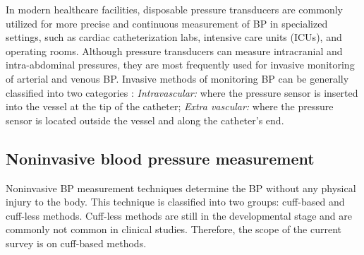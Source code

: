 \documentclass[journal,article,moreauthors]{Definitions/mdpi}
\begin{document}
In modern healthcare facilities, disposable pressure transducers are commonly utilized for more precise and continuous measurement of BP in specialized settings, such as cardiac catheterization labs, intensive care units (ICUs), and operating rooms. Although pressure transducers can measure intracranial and intra-abdominal pressures, they are most frequently used for invasive monitoring of arterial and venous BP. Invasive methods of monitoring BP can be generally classified into two categories \citep{M15}: \textit{Intravascular:} where the pressure sensor is inserted into the vessel at the tip of the catheter; \textit{Extra vascular:} where the pressure sensor is located outside the vessel and along the catheter's end.

\subsection{Noninvasive blood pressure measurement}
Noninvasive BP measurement techniques determine the BP without any physical injury to the body. This technique is classified into two groups: cuff-based and cuff-less methods. Cuff-less methods are still in the developmental stage and are commonly not common in clinical studies. Therefore, the scope of the current survey is on cuff-based methods.

\end{document}
